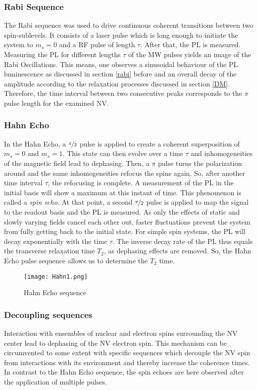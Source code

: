 \documentclass[12pt,a4paper]{article}
\begin{document}
\subsubsection{Rabi Sequence}
The Rabi sequence was used to drive continuous coherent transitions between two spin-sublevels. It consists of a laser pulse which is long enough to initiate the system to $m_s=0$ and a RF pulse of length $\tau$. After that, the PL is measured. Measuring the PL for different lengths $\tau$ of the MW pulses yields an image of the Rabi Oscillations. This means, one observes a sinusoidal behaviour of the PL luminescence as discussed in section \ref{rabi} before and an overall decay of the amplitude according to the relaxation processes discussed in section \ref{DM}. Therefore, the time interval between two consecutive peaks corresponds to the $\pi$ pulse length for the examined NV. 
\subsubsection{Hahn Echo}
In the Hahn Echo, a $\nicefrac{\pi}{2}$ pulse is applied to create a coherent superposition of $m_s=0$ and $m_s=1$. This state can then evolve over a time $\tau$ and inhomogeneities of the magnetic field lead to dephasing. Then, a $\pi$ pulse turns the polarization around and the same inhomogeneities refocus the spins again. So, after another time interval $\tau$, the refocusing is complete. A measurement of the PL in the initial basis will show a maximum at this instant of time. This phenomenon is called a \textit{spin echo}. At that point, a second $\nicefrac{\pi}{2}$ pulse is applied to map the signal to the readout basis \cite{nv1} and the PL is measured. As only the effects of static and slowly varying fields cancel each other out, faster fluctuations prevent the system from fully getting back to the initial state. For simple spin systems, the PL will decay exponentially with the time $\tau$. The inverse decay rate of the PL thus equals the transverse relaxation time $T_2$, as dephasing effects are removed. So, the Hahn Echo pulse sequence allows us to determine the $T_2$ time.
\begin{figure}[H]
\centering
\texttt{[image: Hahn1.png]} 
\caption{Hahn Echo sequence}
\end{figure} 


\subsubsection{Decoupling sequences}\label{Ds}
Interaction with ensembles of nuclear and electron spins surrounding the NV center lead to dephasing of the NV electron spin. This mechanism can be circumvented to some extent with specific sequences which decouple the NV spin from interactions with its environment and thereby increase the coherence times. In contrast to the Hahn Echo sequence, the spin echoes are here observed after the application of multiple pulses.
\end{document}
